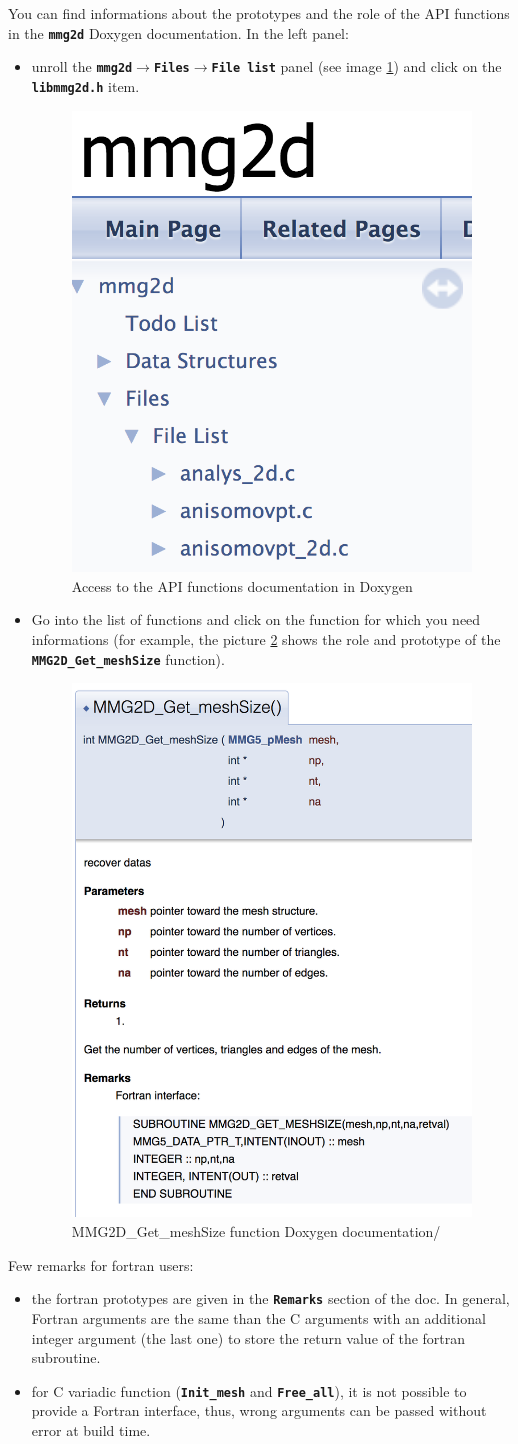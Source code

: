 \documentclass{article}
\newcommand{\ttb}[1]{\texttt{\textbf{#1}}}
\newcommand{\ra}{$\rightarrow$}
\begin{document}
You can find informations about the prototypes and the role of the API
functions in the \ttb{mmg2d} Doxygen
documentation. In the left panel:
\begin{itemize}
\item unroll the \ttb{mmg2d}\ra\ttb{Files}\ra\ttb{File list} panel
  (see image \ref{dox-1}) and click on the \ttb{libmmg2d.h} item.
\begin{figure}
\centering
\includegraphics[width=0.3\linewidth]{Doxygen-1}
\caption{\label{dox-1}
Access to the API functions documentation in Doxygen}
\end{figure}
\item Go into the list of functions and click on the function for
  which you need informations (for example, the picture \ref{dox-2}
  shows the role and prototype of the \ttb{MMG2D\_Get\_meshSize}
    function).
\begin{figure}
\centering
\includegraphics[width=0.5\linewidth]{Doxygen-2}
\caption{\label{dox-2}
MMG2D\_Get\_meshSize function Doxygen documentation/}
\end{figure}
\end{itemize}

Few remarks for fortran users:
\begin{itemize}
\item the fortran prototypes are given in the \ttb{Remarks} section of
  the doc. In general, Fortran arguments are the same than the C
  arguments with an additional integer argument (the last one) to
  store the return value of the fortran subroutine.
\item for C variadic function (\ttb{Init\_mesh} and \ttb{Free\_all}),
  it is not possible to provide a Fortran interface, thus, wrong
  arguments can be passed without error at build time.
\end{itemize}
\end{document}
